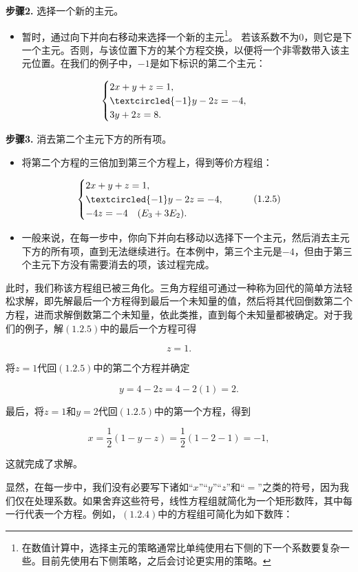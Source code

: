 \textbf{步骤2.} 选择一个新的主元。
\begin{itemize}
	\item 暂时，通过向下并向右移动来选择一个新的主元\footnote{在数值计算中，选择主元的策略通常比单纯使用右下侧的下一个系数要复杂一些。目前先使用右下侧策略，之后会讨论更实用的策略。}。 若该系数不为0，则它是下一个主元。否则，与该位置下方的某个方程交换，以便将一个非零数带入该主元位置。在我们的例子中，$-1$是如下标识的第二个主元：
\end{itemize}
\[
\begin{cases}
	2x + y + z = 1, \\
	\textcircled{-1}y - 2z = -4, \\
	3y + 2z = 8.
\end{cases}
\]

\textbf{步骤3.} 消去第二个主元下方的所有项。
\begin{itemize}
	\item 将第二个方程的三倍加到第三个方程上，得到等价方程组：
\end{itemize}
\[
\begin{cases}
	2x + y + z = 1, \\
	\textcircled{-1}y - 2z = -4, \\
	-4z = -4 \quad (E_3 + 3E_2).
\end{cases}
\tag{1.2.5}
\]

\begin{itemize}
	\item 一般来说，在每一步中，你向下并向右移动以选择下一个主元，然后消去主元下方的所有项，直到无法继续进行。在本例中，第三个主元是\(-4\)，但由于第三个主元下方没有需要消去的项，该过程完成。
\end{itemize}

此时，我们称该方程组已被\(\textbf{三角化}\)。三角方程组可通过一种称为\(\textbf{回代}\)的简单方法轻松求解，即先解最后一个方程得到最后一个未知量的值，然后将其代回倒数第二个方程，进而求解倒数第二个未知量，依此类推，直到每个未知量都被确定。对于我们的例子，解\((1.2.5)\)中的最后一个方程可得

\[ z = 1. \]

将\( z = 1 \)代回\((1.2.5)\)中的第二个方程并确定

\[ y = 4 - 2z = 4 - 2(1) = 2. \]

最后，将\( z = 1 \)和\( y = 2 \)代回\((1.2.5)\)中的第一个方程，得到

\[ x = \frac{1}{2}(1 - y - z) = \frac{1}{2}(1 - 2 - 1) = -1, \]

这就完成了求解。

显然，在每一步中，我们没有必要写下诸如“\( x \)”“\( y \)”“\( z \)”和“\( = \)”之类的符号，因为我们仅在处理系数。如果舍弃这些符号，线性方程组就简化为一个矩形数阵，其中每一行代表一个方程。例如，\((1.2.4)\)中的方程组可简化为如下数阵：

